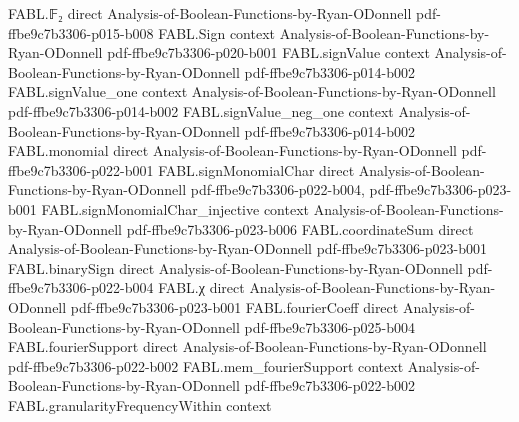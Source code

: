 \begin{theorem}
\leanok
{}
\proofstep
  {FABL.𝔽₂}
  {direct}
  {Analysis-of-Boolean-Functions-by-Ryan-ODonnell}
  {pdf-ffbe9c7b3306-p015-b008}
\proofstep
  {FABL.Sign}
  {context}
  {Analysis-of-Boolean-Functions-by-Ryan-ODonnell}
  {pdf-ffbe9c7b3306-p020-b001}
\proofstep
  {FABL.signValue}
  {context}
  {Analysis-of-Boolean-Functions-by-Ryan-ODonnell}
  {pdf-ffbe9c7b3306-p014-b002}
\proofstep
  {FABL.signValue_one}
  {context}
  {Analysis-of-Boolean-Functions-by-Ryan-ODonnell}
  {pdf-ffbe9c7b3306-p014-b002}
\proofstep
  {FABL.signValue_neg_one}
  {context}
  {Analysis-of-Boolean-Functions-by-Ryan-ODonnell}
  {pdf-ffbe9c7b3306-p014-b002}
\proofstep
  {FABL.monomial}
  {direct}
  {Analysis-of-Boolean-Functions-by-Ryan-ODonnell}
  {pdf-ffbe9c7b3306-p022-b001}
\proofstep
  {FABL.signMonomialChar}
  {direct}
  {Analysis-of-Boolean-Functions-by-Ryan-ODonnell}
  {pdf-ffbe9c7b3306-p022-b004,
    pdf-ffbe9c7b3306-p023-b001}
\proofstep
  {FABL.signMonomialChar_injective}
  {context}
  {Analysis-of-Boolean-Functions-by-Ryan-ODonnell}
  {pdf-ffbe9c7b3306-p023-b006}
\proofstep
  {FABL.coordinateSum}
  {direct}
  {Analysis-of-Boolean-Functions-by-Ryan-ODonnell}
  {pdf-ffbe9c7b3306-p023-b001}
\proofstep
  {FABL.binarySign}
  {direct}
  {Analysis-of-Boolean-Functions-by-Ryan-ODonnell}
  {pdf-ffbe9c7b3306-p022-b004}
\proofstep
  {FABL.χ}
  {direct}
  {Analysis-of-Boolean-Functions-by-Ryan-ODonnell}
  {pdf-ffbe9c7b3306-p023-b001}
\proofstep
  {FABL.fourierCoeff}
  {direct}
  {Analysis-of-Boolean-Functions-by-Ryan-ODonnell}
  {pdf-ffbe9c7b3306-p025-b004}
\proofstep
  {FABL.fourierSupport}
  {direct}
  {Analysis-of-Boolean-Functions-by-Ryan-ODonnell}
  {pdf-ffbe9c7b3306-p022-b002}
\proofstep
  {FABL.mem_fourierSupport}
  {context}
  {Analysis-of-Boolean-Functions-by-Ryan-ODonnell}
  {pdf-ffbe9c7b3306-p022-b002}
\proofstep
  {FABL.granularityFrequencyWithin}
  {context}

\end{theorem}
